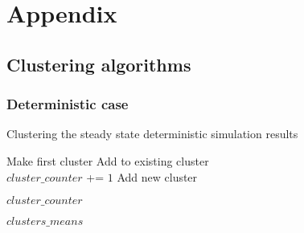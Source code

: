 
\section{Appendix}
\label{Appendix}
\subsection{Clustering algorithms}
\subsubsection{Deterministic case}
\begin{algorithm}
  \caption{Clustering the steady state deterministic simulation results}
 \begin{algorithmic}[1]
 
    \Statex
        
      
      		\State Make first cluster
      	\Else
      					\State Add to existing cluster \\
      					\State {}
      			\EndIf
      				\State $cluster\_counter$ +=  $1$
      				\State Add new cluster
      			\EndIf
      		\EndFor
      	\EndIf
	
      \EndFor
      \State \Return $cluster\_counter$
    \EndFunction
    
    \Statex
    	\State \Return $clusters\_means$
    \EndFunction   
        
  \end{algorithmic}
\end{algorithm}


